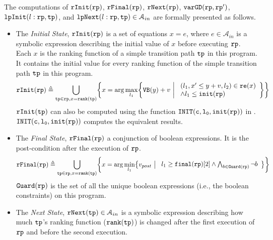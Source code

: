 \begin{defn}
    \label{def:alg-absstate}
   The computations of 
   $\mathtt{rInit}(\mathtt{rp})$, $\mathtt{rFinal}(\mathtt{rp})$, $\mathtt{rNext}(\mathtt{rp})$, $\mathtt{varGD}(\mathtt{rp}, \mathtt{rp}')$, 
   $\mathtt{lpInit}(l: \mathtt{rp}, \mathtt{tp})$, and $\mathtt{lpNext}(l: \mathtt{rp}, \mathtt{tp}) \in \mathcal{A}_{in}$
   are formally presented as follows.
   \begin{itemize}
    \item The \emph{Initial State}, 
    $\mathtt{rInit}(\mathtt{rp})$ is a set of equations $x = e$, where $e \in \mathcal{A}_{in}$ is a
    symbolic expression describing the initial value of $x$ before executing $\mathtt{rp}$.
    Each $x$ is the ranking function of a simple transition path $\mathtt{tp}$ in this program. 
    It contains the initial value for every ranking function of the simple transition path $\mathtt{tp}$ in this program.
   \[
     \rfinit(\rprog) \triangleq 
     \bigcup_{\tpath \in \rprog, x = \locbound(\tpath)}
     \left \{ 
     x = \arg\max_{l_1}\left\{
       \varinvar(y) + v ~\middle\vert~ 
       \begin{array}{l} 
         (l_1, x' \leq y + v, l_2) \in \reset(x) 
         \\
       \land l_1 \leq \absinit(\rprog)
     \end{array}
     \right\}
     \right\}
     \]
   $\mathtt{rInit}(\mathtt{tp})$ can also be computed using the function $\mathtt{INIT(c, l_0, \mathtt{init}(\mathtt{rp}))}$ in \cite{GulwaniJK09}. 
   $\mathtt{INIT(c, l_0, \mathtt{init}(\mathtt{rp}))}$ computes the equivalent results.
   \item  The \emph{Final State}, $\mathtt{rFinal}(\mathtt{rp})$ a conjunction of boolean expressions.
   It is the post-condition
   after the execution of $\mathtt{rp}$.
   \[
     \rffinal(\rprog) \triangleq 
     \bigcup_{\tpath \in \rprog, x = \locbound(\tpath)}
     \left \{ 
     x = \arg\min_{l_1}\left\{
       v_{post} ~\middle\vert~ 
       \begin{array}{l} 
        l_1 \geq \absfinal(\rprog)[2]
       \land \bigwedge_{b \in \kw{Guard}(\rprog)} \neg b
     \end{array}
     \right\}
     \right\}
     \]
    $\mathtt{Guard}(\mathtt{rp})$ is the set of all the unique boolean expressions (i.e., the boolean constraints) on this program.
   \item The \emph{Next State}, $\mathtt{rNext}(\mathtt{tp}) \in \mathcal{A}_{in}$ 
   is a
   symbolic expression describing how much $\mathtt{tp}$'s ranking function ($\mathtt{rank}(\mathtt{tp})$) is changed after the first execution of $\mathtt{rp}$ and before the second execution.

\end{itemize}
\end{defn}
